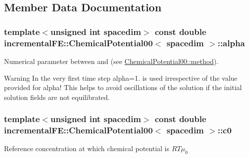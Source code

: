 \subsection{Member Data Documentation}
\subsubsection[{\texorpdfstring{alpha}{alpha}}]{\setlength{\rightskip}{0pt plus 5cm}template$<$unsigned int spacedim$>$ const double {\bf incremental\+F\+E\+::\+Chemical\+Potential00}$<$ spacedim $>$\+::alpha\hspace{0.3cm}{\ttfamily [private]}}\hypertarget{classincremental_f_e_1_1_chemical_potential00_ad00b92c170d812c26e6429f07dd16790}{}\label{classincremental_f_e_1_1_chemical_potential00_ad00b92c170d812c26e6429f07dd16790}
Numerical parameter between {} and {} (see \hyperlink{classincremental_f_e_1_1_chemical_potential00_ac264752dace0c782bf4c1fe5d620e6dc}{Chemical\+Potential00\+::method}).

\begin{DoxyWarning}{Warning}
In the very first time step {\ttfamily alpha=1.} is used irrespective of the value provided for {\ttfamily alpha!} This helps to avoid oscillations of the solution if the initial solution fields are not equilibrated. 
\end{DoxyWarning}
\subsubsection[{\texorpdfstring{c0}{c0}}]{\setlength{\rightskip}{0pt plus 5cm}template$<$unsigned int spacedim$>$ const double {\bf incremental\+F\+E\+::\+Chemical\+Potential00}$<$ spacedim $>$\+::c0\hspace{0.3cm}{\ttfamily [private]}}\hypertarget{classincremental_f_e_1_1_chemical_potential00_a99a75102bed91046fbbf9098de7ecd89}{}\label{classincremental_f_e_1_1_chemical_potential00_a99a75102bed91046fbbf9098de7ecd89}
Reference concentration at which chemical potential is $RT\mu_0$ 
